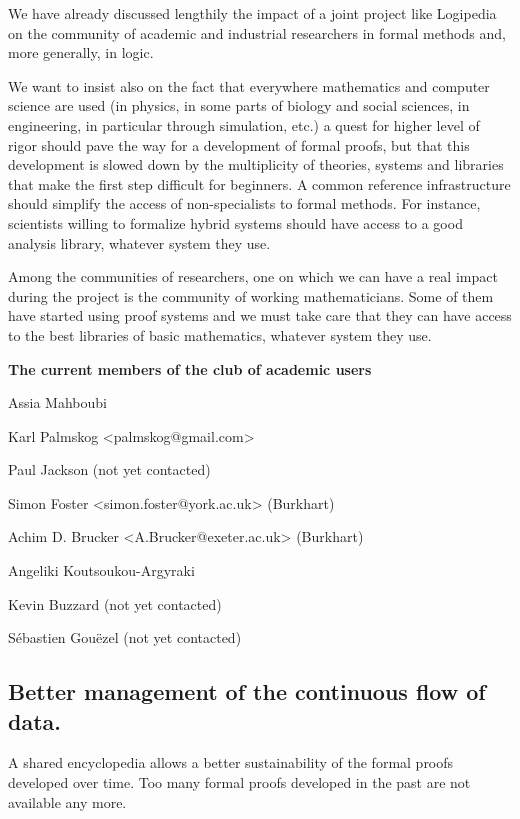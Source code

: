 We have already discussed lengthily the impact of a joint project like
Logipedia on the community of academic and industrial researchers in
formal methods and, more generally, in logic.

We want to insist also on the fact that everywhere mathematics and
computer science are used (in physics, in some parts of biology and
social sciences, in engineering, in particular through simulation,
etc.) a quest for higher level of rigor should pave the way for a
development of formal proofs, but that this development is slowed down
by the multiplicity of theories, systems and libraries that make the
first step difficult for beginners. A common reference infrastructure
should simplify the access of non-specialists to formal methods.  For
instance, scientists willing to formalize hybrid systems should have
access to a good analysis library, whatever system they use.

Among the communities of researchers, one on which we can have a real
impact during the project is the community of working mathematicians.
Some of them have started using proof systems and we must take care that they
can have access to the best libraries of basic mathematics, whatever system
they use.


\begin{framed}
\begin{center}
  {\bf \Large The current members of the club of academic users}
\end{center}
  
Assia Mahboubi
  
Karl Palmskog <palmskog@gmail.com> 

Paul Jackson (not yet contacted)

Simon Foster <simon.foster@york.ac.uk> (Burkhart)

Achim D. Brucker <A.Brucker@exeter.ac.uk> (Burkhart)

Angeliki Koutsoukou-Argyraki 

Kevin Buzzard (not yet contacted)

Sébastien Gouëzel (not yet contacted)
\end{framed}

\subsection{Better management of the continuous flow of data.}

A shared encyclopedia allows a better sustainability of the formal
proofs developed over time. Too many formal proofs developed in the
past are not available any more.

